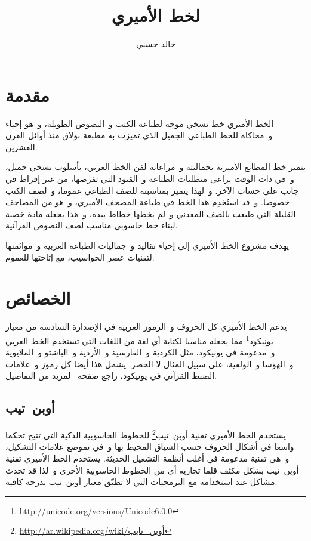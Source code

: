 \documentclass[a4paper]{article}
\title{\titlefont {\addfontfeatures{CharacterVariant=1}ا}لخط الأمير{\addfontfeatures{CharacterVariant=1}ي}}
\author{خالد حسني}
\begin{document}
\maketitle
\tableofcontents


\section{مقدمة}

الخط الأميري خط نسخي موجه لطباعة الكتب و النصوص الطويلة، و هو إحياء و محاكاة
للخط الطباعي الجميل الذي تميزت به مطبعة بولاق منذ أوائل القرن العشرين.

يتميز خط المطابع الأميرية بجماليته و مراعاته لفن الخط العربي، بأسلوب
نسخي جميل، و في ذات الوقت يراعى متطلبات الطباعة و القيود التي تفرضها، من
غير إفراط في جانب على حساب الآخر. و لهذا يتميز بمناسبته للصف الطباعي
عموما، و لصف الكتب خصوصا. و قد استُخدِم هذا الخط في طباعة المصحف
الأميري، و هو من المصاحف القليلة التي طبعت بالصف المعدني و لم يخطها خطاط
بيده، و هذا يجعله مادة خصبة لبناء خط حاسوبي مناسب لصف النصوص القرآنية.

يهدف مشروع الخط الأميري إلى إحياء تقاليد و جماليات الطباعة العربية
و موائمتها لتقنيات عصر الحواسيب، مع إتاحتها للعموم.

\section{الخصائص}
يدعم الخط الأميري كل الحروف و الرموز العربية في الإصدارة السادسة من
معيار يونيكود\footnote{\url{http://unicode.org/versions/Unicode6.0.0}}
مما يجعله مناسبا لكتابة أي لغة من اللغات التي تستخدم الخط العربي
و مدعومة في يونيكود، مثل الكردية و الفارسية و الأردية و الباشتو
و الملايوية و الهوسا و الولفية، على سبيل المثال لا الحصر. يشمل هذا أيضا
كل رموز و علامات الضبط القرآني في يونيكود، راجع
صفحة \pageref{ref:quranic-text} لمزيد من التفاصيل.

\subsection{أوبن تيب}
يستخدم الخط الأميري تقنية
أوبن تيب\footnote{\url{http://ar.wikipedia.org/wiki/أوبن_تايب}} للخطوط
الحاسوبية الذكية التي تتيح تحكما واسعا في أشكال الحروف حسب السياق المحيط
بها و في تموضع علامات التشكيل، و هي تقنية مدعومة في أغلب أنظمة التشغيل
الحديثة. يستخدم الخط الأميري تقنية أوبن تيب بشكل مكثف قلما تجاريه أي من
الخطوط الحاسوبية الأخرى و لذا قد تحدث مشاكل عند استخدامه مع البرمجيات
التي لا تطبّق معيار أوبن تيب بدرجة كافية.
\end{document}
